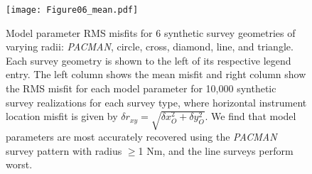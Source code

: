 \begin{figure}[h]
\texttt{[image: Figure06\_mean.pdf]}
\caption{ Model parameter RMS misfits for 6 synthetic survey geometries of varying radii: \textit{PACMAN}, circle, cross, diamond, line, and triangle. Each survey geometry is shown to the left of its respective legend entry. The left column shows the mean misfit and right column show the RMS misfit for each model parameter for 10,000 synthetic survey realizations for each survey type, where horizontal instrument location misfit is given by $\delta r_{xy} = \sqrt{\delta x_{O}^2 + \delta y_{O}^2} $. We find that model parameters are most accurately recovered using the \textit{PACMAN} survey pattern with radius $\geq$1 Nm, and the line surveys perform worst. }
\label{fig:survey_geom_explore}
\end{figure}

